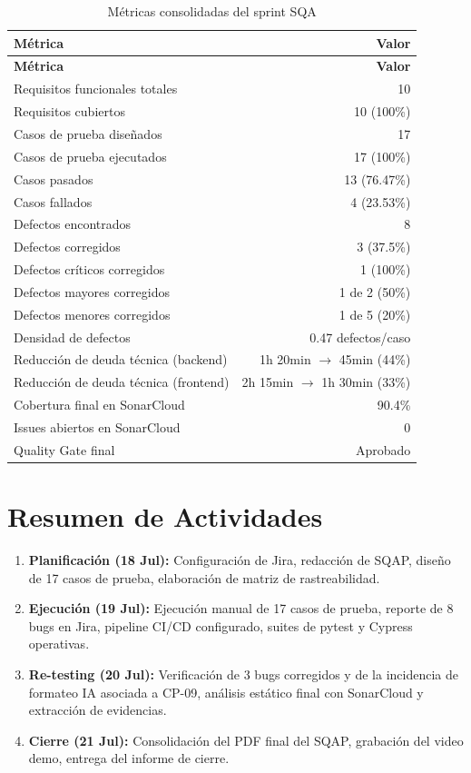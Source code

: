 \begin{longtable}{lr}
\caption{Métricas consolidadas del sprint SQA}
\label{tab:metricas-consolidadas}\\
\toprule
\textbf{Métrica} & \textbf{Valor}\\
\midrule
\endfirsthead
\toprule
\textbf{Métrica} & \textbf{Valor}\\
\midrule
\endhead
\bottomrule
\endfoot

Requisitos funcionales totales & 10\\
Requisitos cubiertos & 10 (100\%)\\
Casos de prueba diseñados & 17\\
Casos de prueba ejecutados & 17 (100\%)\\
Casos pasados & 13 (76.47\%)\\
Casos fallados & 4 (23.53\%)\\
Defectos encontrados & 8\\
Defectos corregidos & 3 (37.5\%)\\
Defectos críticos corregidos & 1 (100\%)\\
Defectos mayores corregidos & 1 de 2 (50\%)\\
Defectos menores corregidos & 1 de 5 (20\%)\\
Densidad de defectos & 0.47 defectos/caso\\
Reducción de deuda técnica (backend) & 1h 20min $\rightarrow$ 45min (44\%)\\
Reducción de deuda técnica (frontend) & 2h 15min $\rightarrow$ 1h 30min (33\%)\\
Cobertura final en SonarCloud & 90.4\%\\
Issues abiertos en SonarCloud & 0\\
Quality Gate final & Aprobado\\

\bottomrule
\end{longtable}

\section{Resumen de Actividades}

\begin{enumerate}
    \item \textbf{Planificación (18 Jul):} Configuración de Jira, redacción de SQAP, diseño de 17 casos de prueba, elaboración de matriz de rastreabilidad.
    \item \textbf{Ejecución (19 Jul):} Ejecución manual de 17 casos de prueba, reporte de 8 bugs en Jira, pipeline CI/CD configurado, suites de pytest y Cypress operativas.
    \item \textbf{Re-testing (20 Jul):} Verificación de 3 bugs corregidos y de la incidencia de formateo IA asociada a CP-09, análisis estático final con SonarCloud y extracción de evidencias.
    \item \textbf{Cierre (21 Jul):} Consolidación del PDF final del SQAP, grabación del video demo, entrega del informe de cierre.
\end{enumerate}

